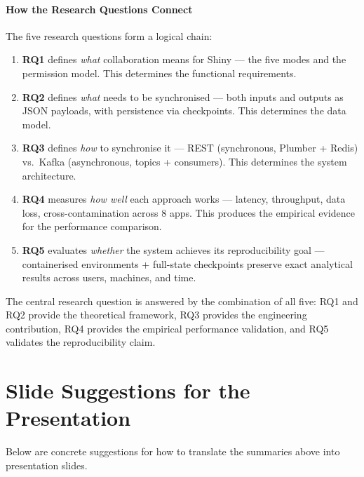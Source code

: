 \documentclass[12pt,a4paper]{article}
\begin{document}
\subsection{How the Research Questions Connect}

The five research questions form a logical chain:

\begin{enumerate}
  \item \textbf{RQ1} defines \textit{what} collaboration means for Shiny --- the five modes and the permission model. This determines the functional requirements.
  \item \textbf{RQ2} defines \textit{what} needs to be synchronised --- both inputs and outputs as JSON payloads, with persistence via checkpoints. This determines the data model.
  \item \textbf{RQ3} defines \textit{how} to synchronise it --- REST (synchronous, Plumber + Redis) vs.\ Kafka (asynchronous, topics + consumers). This determines the system architecture.
  \item \textbf{RQ4} measures \textit{how well} each approach works --- latency, throughput, data loss, cross-contamination across 8 apps. This produces the empirical evidence for the performance comparison.
  \item \textbf{RQ5} evaluates \textit{whether} the system achieves its reproducibility goal --- containerised environments + full-state checkpoints preserve exact analytical results across users, machines, and time.
\end{enumerate}

The central research question is answered by the combination of all five: RQ1 and RQ2 provide the theoretical framework, RQ3 provides the engineering contribution, RQ4 provides the empirical performance validation, and RQ5 validates the reproducibility claim.

\newpage


\part{Slide Suggestions for the Presentation}

Below are concrete suggestions for how to translate the summaries above into presentation slides.

\end{document}
